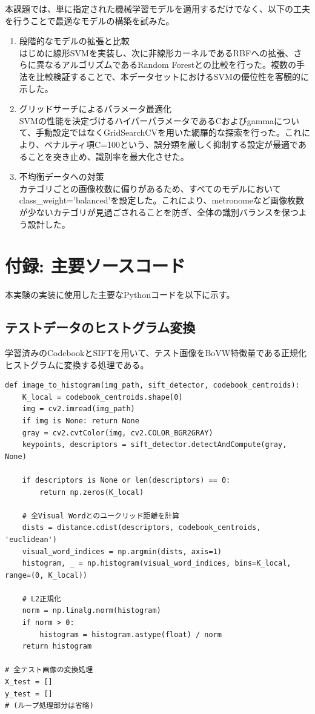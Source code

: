 \documentclass[a4paper,11pt]{jsarticle}
\renewcommand{\thesection}{\alph{section}.}
\begin{document}
本課題では、単に指定された機械学習モデルを適用するだけでなく、以下の工夫を行うことで最適なモデルの構築を試みた。

\begin{enumerate}
    \item 段階的なモデルの拡張と比較\\
    はじめに線形SVMを実装し、次に非線形カーネルであるRBFへの拡張、さらに異なるアルゴリズムであるRandom Forestとの比較を行った。複数の手法を比較検証することで、本データセットにおけるSVMの優位性を客観的に示した。
    
    \item グリッドサーチによるパラメータ最適化\\
    SVMの性能を決定づけるハイパーパラメータであるCおよびgammaについて、手動設定ではなくGridSearchCVを用いた網羅的な探索を行った。これにより、ペナルティ項C=100という、誤分類を厳しく抑制する設定が最適であることを突き止め、識別率を最大化させた。
    
    \item 不均衡データへの対策\\
    カテゴリごとの画像枚数に偏りがあるため、すべてのモデルにおいてclass\_weight='balanced'を設定した。これにより、metronomeなど画像枚数が少ないカテゴリが見過ごされることを防ぎ、全体の識別バランスを保つよう設計した。
\end{enumerate}

\appendix
\renewcommand{\thesection}{\Alph{section}.}

\section{付録: 主要ソースコード}
本実験の実装に使用した主要なPythonコードを以下に示す。

\subsection*{テストデータのヒストグラム変換}
学習済みのCodebookとSIFTを用いて、テスト画像をBoVW特徴量である正規化ヒストグラムに変換する処理である。

\begin{lstlisting}[caption=テストデータの準備]
def image_to_histogram(img_path, sift_detector, codebook_centroids):
    K_local = codebook_centroids.shape[0]
    img = cv2.imread(img_path)
    if img is None: return None
    gray = cv2.cvtColor(img, cv2.COLOR_BGR2GRAY)
    keypoints, descriptors = sift_detector.detectAndCompute(gray, None)
    
    if descriptors is None or len(descriptors) == 0:
        return np.zeros(K_local)
    
    # 全Visual Wordとのユークリッド距離を計算
    dists = distance.cdist(descriptors, codebook_centroids, 'euclidean')
    visual_word_indices = np.argmin(dists, axis=1)
    histogram, _ = np.histogram(visual_word_indices, bins=K_local, range=(0, K_local))
    
    # L2正規化
    norm = np.linalg.norm(histogram)
    if norm > 0:
        histogram = histogram.astype(float) / norm
    return histogram

# 全テスト画像の変換処理
X_test = []
y_test = []
# (ループ処理部分は省略)
\end{lstlisting}
\end{document}
